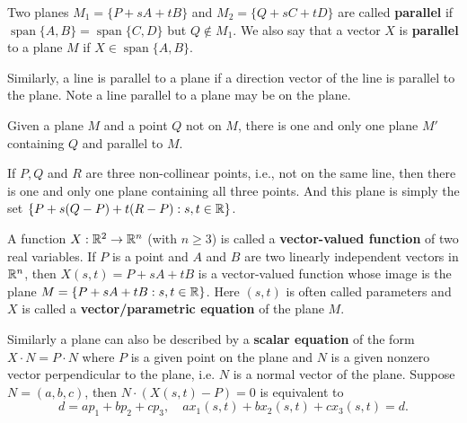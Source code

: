 \documentclass[a4paper]{ctexart}
\begin{document}
    \begin{mydef}
        Two planes $M_1 = \{ P + sA + tB\}$ and $M_2 = \{ Q + sC + tD\}$ are called \textbf{parallel} if $\operatorname{span} \{A,B\} = \operatorname{span} \{C,D\}$ but $Q\notin M_1$. We also say that a vector $X$ is \textbf{parallel} to a plane $M$ if $X\in \operatorname{span} \{A,B\}$.
    \end{mydef}
    \begin{myrmk}
        Similarly, a line is parallel to a plane if a direction vector of the line is parallel to the plane. Note a line parallel to a plane may be on the plane.
    \end{myrmk}
    \begin{mythm}
        Given a plane $M$ and a point $Q$ not on $M$, there is one and only one plane $M'$ containing $Q$ and parallel to $M$.
    \end{mythm}
    \begin{mythm}
        If $P,Q$ and $R$ are three non-collinear points, i.e., not on the same line, then there is one and only one plane containing all three points. And this plane is simply the set $\{ P + s(Q-P) + t(R-P) : s,t\in \mathbb{R}\}$.
    \end{mythm}
    \begin{mydef}
        A function $X: \mathbb{R}^2 \to \mathbb{R}^n$ (with $n\ge 3$) is called a \textbf{vector-valued function} of two real variables. If $P$ is a point and $A$ and $B$ are two linearly independent vectors in $\mathbb{R}^n$, then $X(s,t) = P + sA + tB$ is a vector-valued function whose image is the plane $M = \{ P + sA + tB : s,t\in \mathbb{R}\}$. Here $(s,t)$ is often called parameters and $X$ is called a \textbf{vector/parametric equation} of the plane $M$.
    \end{mydef}
    \begin{myrmk}
        Similarly a plane can also be described by a \textbf{scalar equation} of the form $X\cdot N = P\cdot N$ where $P$ is a given point on the plane and $N$ is a given nonzero vector perpendicular to the plane, i.e. $N$ is a normal vector of the plane. Suppose $N=(a,b,c)$, then $N\cdot (X(s,t)-P) = 0$ is equivalent to
        \[
        d = ap_1 + bp_2 + cp_3, \quad ax_1(s,t) + bx_2(s,t) + cx_3(s,t) = d.
        \]
    \end{myrmk}
\end{document}
